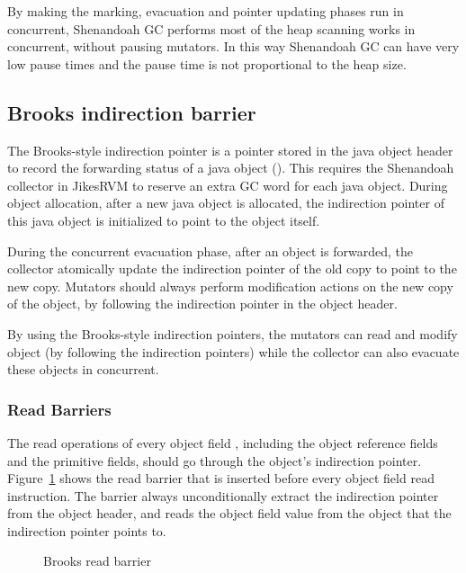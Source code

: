 By making the marking, evacuation and pointer updating phases run in concurrent, Shenandoah GC performs
most of the heap scanning works in concurrent, without pausing mutators. In this way
Shenandoah GC can have very low pause times and the pause time is not proportional
to the heap size.

\subsection{Brooks indirection barrier}


The Brooks-style indirection pointer is a pointer stored in the java object header
to record the forwarding status of a java object (\cite{flood2016shenandoah}).
This requires the Shenandoah collector in JikesRVM to reserve an extra GC word for each
java object. During object allocation, after a new java object is allocated, the indirection
pointer of this java object is initialized to point to the object itself.

During the concurrent evacuation phase, after an object is forwarded,
the collector atomically update the indirection pointer of the old copy to point to the new copy.
Mutators should always perform modification actions on the new copy of the object,
by following the indirection pointer in the object header.

By using the Brooks-style indirection pointers, the mutators can read and modify object 
(by following the indirection pointers) while the collector can also evacuate these
objects in concurrent.

\subsubsection{Read Barriers}

The read operations of every object field , including the object
reference fields and the primitive fields, should go through the object's indirection pointer.
Figure~\ref{fig:brooksreadbarrier} shows the read barrier that is inserted before every object field read instruction.
The barrier always unconditionally extract the indirection pointer from the object header,
and reads the object field value from the object that the indirection pointer points to.

\begin{figure}
  \centering
  
  \caption{Brooks read barrier}
  \label{fig:brooksreadbarrier}
\end{figure}

